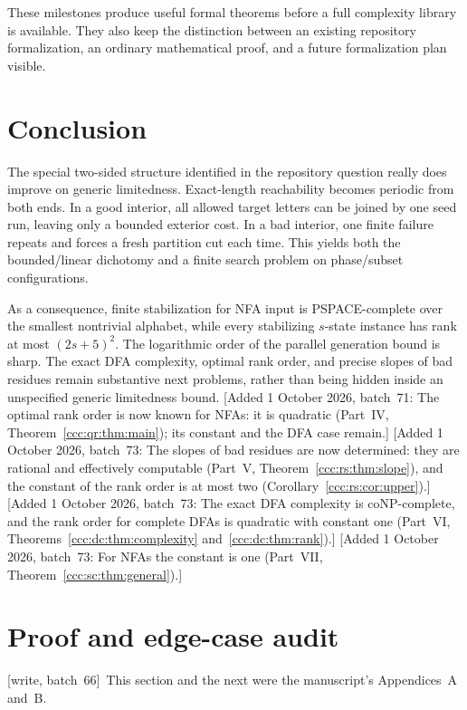 \documentclass[11pt,letterpaper]{article}
\theoremstyle{definition}
\theoremstyle{remark}
\newcommand{\wsix}{\textup{[write, batch~66]}}
\newcommand{\waddsevone}[1]{\textup{[}Added 1 October 2026, batch~71: #1\textup{]}}
\newcommand{\waddsevthree}[1]{\textup{[}Added 1 October 2026, batch~73: #1\textup{]}}
\begin{document}
These milestones produce useful formal theorems before a full complexity
library is available. They also keep the distinction between an existing
repository formalization, an ordinary mathematical proof, and a future
formalization plan visible.

\section{Conclusion}\label{ccc:ps:sec:conclusion}

The special two-sided structure identified in the repository question
really does improve on generic limitedness. Exact-length reachability
becomes periodic from both ends. In a good interior, all allowed target
letters can be joined by one seed run, leaving only a bounded exterior
cost. In a bad interior, one finite failure repeats and forces a fresh
partition cut each time. This yields both the bounded/linear dichotomy
and a finite search problem on phase/subset configurations.

As a consequence, finite stabilization for NFA input is PSPACE-complete
over the smallest nontrivial alphabet, while every stabilizing $s$-state
instance has rank at most $(2s+5)^2$. The logarithmic order of the parallel
generation bound is sharp. The exact DFA complexity, optimal rank order,
and precise slopes of bad residues remain substantive next problems,
rather than being hidden inside an unspecified generic limitedness bound.
\waddsevone{The optimal rank order is now known for NFAs: it is quadratic
(Part~IV, Theorem~\ref{ccc:qr:thm:main}); its constant and the DFA case
remain.}
\waddsevthree{The slopes of bad residues are now determined: they are
rational and effectively computable (Part~V,
Theorem~\ref{ccc:rs:thm:slope}), and the constant of the rank order is at
most two (Corollary~\ref{ccc:rs:cor:upper}).}
\waddsevthree{The exact DFA complexity is coNP-complete, and the rank order
for complete DFAs is quadratic with constant one (Part~VI,
Theorems~\ref{ccc:dc:thm:complexity} and~\ref{ccc:dc:thm:rank}).}
\waddsevthree{For NFAs the constant is one (Part~VII,
Theorem~\ref{ccc:sc:thm:general}).}

\section{Proof and edge-case audit}\label{ccc:ps:app:audit}

\wsix\ This section and the next were the manuscript's Appendices~A and~B.
\end{document}
